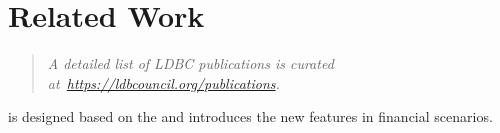 \chapter{Related Work}
\label{sec:related-work}

\begin{quote}
    \textit{A detailed list of LDBC publications is curated at~\url{https://ldbcouncil.org/publications}.}
\end{quote}




\ldbcfinbench is designed based on the \ldbcsnb and introduces the new features in financial scenarios.